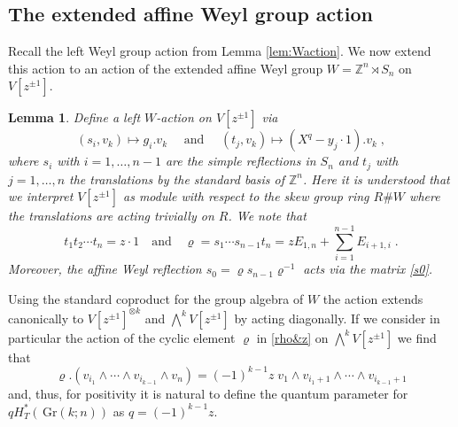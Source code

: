 \documentclass[12pt]{amsart}
\newcommand{\Z}{\mathbb{Z}}
\newcommand{\Gr}{\,\mathrm{Gr}}
\newcommand{\ring}{R}
\newtheorem{lemma}[prop]{Lemma}
\numberwithin{equation}{section}
\numberwithin{figure}{section}
\begin{document}
\subsection{The extended affine Weyl group action}
Recall the left Weyl group action from Lemma \ref{lem:Waction}. We now extend this action to an action of the extended affine Weyl group $W=\Z^n\rtimes S_n$ on $V[z^{\pm 1}]$.
\begin{lemma}\label{lem:Waffaction}
    Define a left $W$-action on $V[z^{\pm 1}]$ via
    \begin{equation}
    (s_i,v_k)\mapsto g_i.v_k\quad\text{ and }\quad (t_j,v_k)\mapsto (X^q-y_j\cdot1).v_k\;,
    \end{equation}
    where $s_i$ with $i=1,\ldots,n-1$ are the simple reflections in $S_n$ and $t_j$ with $j=1,\ldots,n$ the translations by the standard basis of $\Z^n$. Here it is understood that we interpret $V[z^{\pm 1}]$ as module with respect to the skew group ring $\ring\#W$ where the translations are acting trivially on $\ring$.  We note that
    \begin{equation}\label{rho&z}
    t_1t_2\cdots t_n=z\cdot1\quad\text{and}\quad\varrho=s_1\cdots s_{n-1}t_n=zE_{1,n}+\sum_{i=1}^{n-1}E_{i+1,i}\;.
    \end{equation}
    Moreover, the affine Weyl reflection $s_0=\varrho s_{n-1}\varrho^{-1}$ acts via the matrix \eqref{s0}.
\end{lemma}
Using the standard coproduct for the group algebra of $W$ the action extends canonically to $V[z^{\pm 1}]^{\otimes k}$ and $\bigwedge^kV[z^{\pm 1}]$ by acting diagonally. If we consider in particular the action of the cyclic element $\varrho$ in \eqref{rho&z} on $\bigwedge^kV[z^{\pm 1}]$ we find that
\[
\varrho.(v_{i_1}\wedge\cdots\wedge v_{i_{k-1}}\wedge v_n )=
(-1)^{k-1}z\;v_1\wedge v_{i_1+1}\wedge\cdots\wedge v_{i_{k-1}+1}
\]
and, thus, for positivity it is natural to define the quantum parameter for $qH^*_T(\Gr(k;n))$ as $q=(-1)^{k-1}z$.
\end{document}
